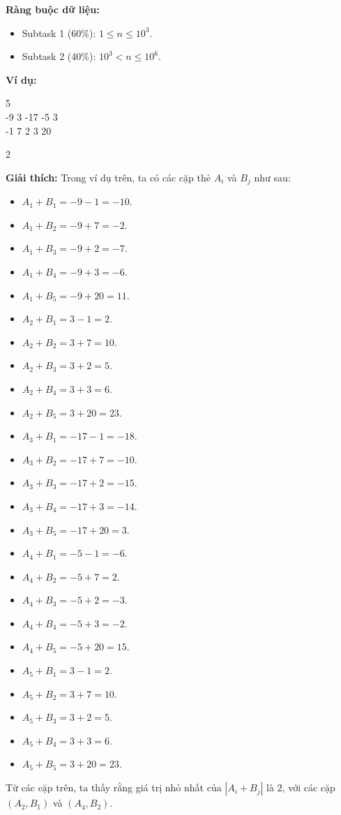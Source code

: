 \documentclass[12pt]{scrartcl}  %
\begin{document}
\textbf{Ràng buộc dữ liệu:}
\begin{itemize}
    \item Subtask 1 (60\%): $1 \leq n \leq 10^3$.
    \item Subtask 2 (40\%): $10^3 < n \leq 10^6$.
\end{itemize}

\textbf{Ví dụ:}
\begin{tcolorbox}[colback=gray!5!white, colframe=blue!50!black, title=Input]
5\\
-9 3 -17 -5 3\\
-1 7 2 3 20
\end{tcolorbox}
\begin{tcolorbox}[colback=gray!5!white, colframe=green!50!black, title=Output]
2
\end{tcolorbox}

\textbf{Giải thích:}
Trong ví dụ trên, ta có các cặp thẻ $A_i$ và $B_j$ như sau:
\begin{itemize}
    \item $A_1 + B_1 = -9 - 1 = -10$.
    \item $A_1 + B_2 = -9 + 7 = -2$.
    \item $A_1 + B_3 = -9 + 2 = -7$.
    \item $A_1 + B_4 = -9 + 3 = -6$.
    \item $A_1 + B_5 = -9 + 20 = 11$.
    \item $A_2 + B_1 = 3 - 1 = 2$.
    \item $A_2 + B_2 = 3 + 7 = 10$.
    \item $A_2 + B_3 = 3 + 2 = 5$.
    \item $A_2 + B_4 = 3 + 3 = 6$.
    \item $A_2 + B_5 = 3 + 20 = 23$.
    \item $A_3 + B_1 = -17 - 1 = -18$.
    \item $A_3 + B_2 = -17 + 7 = -10$.
    \item $A_3 + B_3 = -17 + 2 = -15$.
    \item $A_3 + B_4 = -17 + 3 = -14$.
    \item $A_3 + B_5 = -17 + 20 = 3$.
    \item $A_4 + B_1 = -5 - 1 = -6$.
    \item $A_4 + B_2 = -5 + 7 = 2$.
    \item $A_4 + B_3 = -5 + 2 = -3$.
    \item $A_4 + B_4 = -5 + 3 = -2$.
    \item $A_4 + B_5 = -5 + 20 = 15$.
    \item $A_5 + B_1 = 3 - 1 = 2$.
    \item $A_5 + B_2 = 3 + 7 = 10$.
    \item $A_5 + B_3 = 3 + 2 = 5$.
    \item $A_5 + B_4 = 3 + 3 = 6$.
    \item $A_5 + B_5 = 3 + 20 = 23$.
\end{itemize}
Từ các cặp trên, ta thấy rằng giá trị nhỏ nhất của $|A_i + B_j|$ là $2$, với các cặp $(A_2, B_1)$ và $(A_4, B_2)$.
\end{document}
